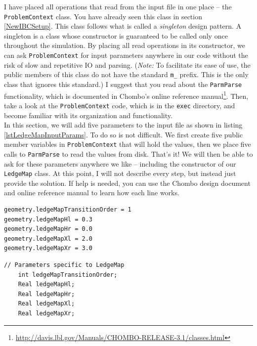 \documentclass[12pt]{article}
\begin{document}
I have placed all operations that read from the input file in one place -- the \texttt{ProblemContext} class. You have already seen this class in section \ref{NewIBCSetup}. This class follows what is called a \textit{singleton} design pattern. A singleton is a class whose constructor is guaranteed to be called only once throughout the simulation. By placing all read operations in its constructor, we can ask \texttt{ProblemContext} for input parameters anywhere in our code without the risk of slow and repetitive IO and parsing. (\textit{Note:} To facilitate its ease of use, the public members of this class do not have the standard \texttt{m\_} prefix. This is the only class that ignores this standard.) I suggest that you read about the \texttt{ParmParse} functionality, which is documented in Chombo's online reference manual\footnote{\url{http://davis.lbl.gov/Manuals/CHOMBO-RELEASE-3.1/classes.html}}. Then, take a look at the \texttt{ProblemContext} code, which is in the \texttt{exec} directory, and become familiar with its organization and functionality.\\

In this section, we will add five parameters to the input file as shown in listing \ref{lstLedgeMapInputParams}. To do so is not difficult. We first create five public member variables in \texttt{ProblemContext} that will hold the values, then we place five calls to \texttt{ParmParse} to read the values from disk. That's it! We will then be able to ask for these parameters anywhere we like -- including the constructor of our \texttt{LedgeMap} class. At this point, I will not describe every step, but instead just provide the solution. If help is needed, you can use the Chombo design document and online reference manual to learn how each line works.

\begin{lstlisting}[caption={The five new input parameters that describe the ledge.},label=lstLedgeMapInputParams]
geometry.ledgeMapTransitionOrder = 1
geometry.ledgeMapHl = 0.3
geometry.ledgeMapHr = 0.0
geometry.ledgeMapXl = 2.0
geometry.ledgeMapXr = 3.0
\end{lstlisting}

\begin{lstlisting}[caption={\texttt{ProblemContext}'s new member variables. This should be placed in the public block under the \texttt{readGeometry()} declaration in \texttt{ProblemContext.H}.}]
	// Parameters specific to LedgeMap
	int ledgeMapTransitionOrder;
	Real ledgeMapHl;
	Real ledgeMapHr;
	Real ledgeMapXl;
	Real ledgeMapXr;
\end{lstlisting}
\end{document}
